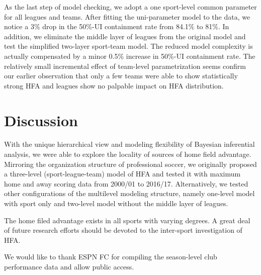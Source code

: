 \documentclass[USenglish]{article}
\begin{document}
As the last step of model checking, we adopt a one sport-level common parameter for all leagues and teams. After fitting the uni-parameter model to the data, we notice a 3\%  drop in the 50\%-UI containment rate from 84.1\% to 81\%.
In addition, we eliminate the middle layer of leagues from the original model and test the simplified two-layer sport-team model. The reduced model complexity is actually compensated by a minor 0.5\% increase in 50\%-UI containment rate.  
The relatively small incremental effect of team-level parametrization seems confirm our earlier observation that only a few teams were able to show statistically strong HFA and leagues show no palpable impact on HFA distribution.



\section{Discussion}

With the unique hierarchical view and modeling flexibility of Bayesian inferential analysis, we were able to explore the locality of sources of home field advantage. Mirroring the organization structure of professional soccer, we originally proposed a three-level (sport-league-team) model of HFA and tested it with maximum home and away scoring data from 2000/01 to 2016/17. Alternatively, we tested other configurations of the multilevel modeling structure, namely one-level model with sport only and two-level model without the middle layer of leagues.

The home filed advantage exists in all sports with varying degrees. A great deal of future research efforts should be devoted to the inter-sport investigation of HFA. 

\newpage
\begin{acknowledgement}

We would like to thank ESPN FC for compiling the season-level club performance data and allow public access.

\end{acknowledgement}

\newpage

%

\end{document}
